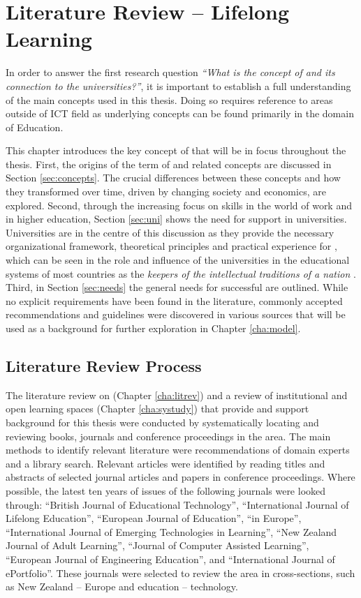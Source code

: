 \chapter{Literature Review -- Lifelong Learning \label{cha:litrev}}
In order to answer the first research question \textit{``What is the concept of
\LLLs and its connection to the universities?''}, it is important to establish a
full understanding of the main concepts used in this thesis. Doing so requires 
reference to areas outside of ICT field as underlying concepts can be found
primarily in the domain of Education.

This chapter introduces the key concept of \LLLs that will be in focus
throughout the thesis. First, the origins of the term of \textit{\LLLsn} and
related concepts are discussed in Section \ref{sec:concepts}. The crucial
differences between these concepts and how they transformed over time, driven by
changing society and economics, are explored. Second, through the increasing
focus on \LLLs skills in the world of work and in higher education, Section
\ref{sec:uni} shows the need for \LLLs support in universities. Universities are
in the centre of this discussion as they provide the necessary organizational
framework, theoretical principles and practical experience for \LLLs
\citep{Knapper2000}, which can be seen in the role and influence of the
universities in the educational systems of most countries as the \textit{keepers
of the intellectual traditions of a nation} \citep[p.~96]{Longworth2003}. Third,
in Section \ref{sec:needs} the general needs for successful \LLLs are outlined.
While no explicit requirements have been found in the literature, commonly
accepted recommendations and guidelines were discovered in various sources that
will be used as a background for further exploration in Chapter \ref{cha:model}.

\section{Literature Review Process}
The literature review on \LLLs (Chapter \ref{cha:litrev}) and a review of
institutional and open learning spaces (Chapter \ref{cha:systudy}) that provide
and support background for this thesis were conducted by systematically locating
and reviewing books, journals and conference proceedings in the area. The main
methods to identify relevant literature were recommendations of domain experts
and a library search. Relevant articles were identified by reading titles and
abstracts of selected journal articles and papers in conference proceedings.
Where possible, the latest ten years of issues of the following journals were
looked through: ``British Journal of Educational Technology'', ``International
Journal of Lifelong Education'', ``European Journal of Education'', ``\LLLc in
Europe'', ``International Journal of Emerging Technologies in Learning'', ``New
Zealand Journal of Adult Learning'', ``Journal of Computer Assisted Learning'',
``European Journal of Engineering Education'', and ``International Journal of
ePortfolio''. These journals were selected to review the area in cross-sections,
such as New Zealand -- Europe and education -- technology.

